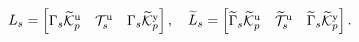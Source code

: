 \begin{align*}
    L_s &= \begin{bmatrix} \Gamma_s\tKp{u} & \mathcal{T}_s^\mathrm{u} & \Gamma_s\tKp{y} \end{bmatrix},%
    \quad \widetilde{L}_s = \begin{bmatrix} \widetilde{\Gamma}_s\tKp{u} & \widetilde{\mathcal{T}}_s^\mathrm{u} & \widetilde{\Gamma}_s\tKp{y} \end{bmatrix}%
    .
\end{align*}

%
